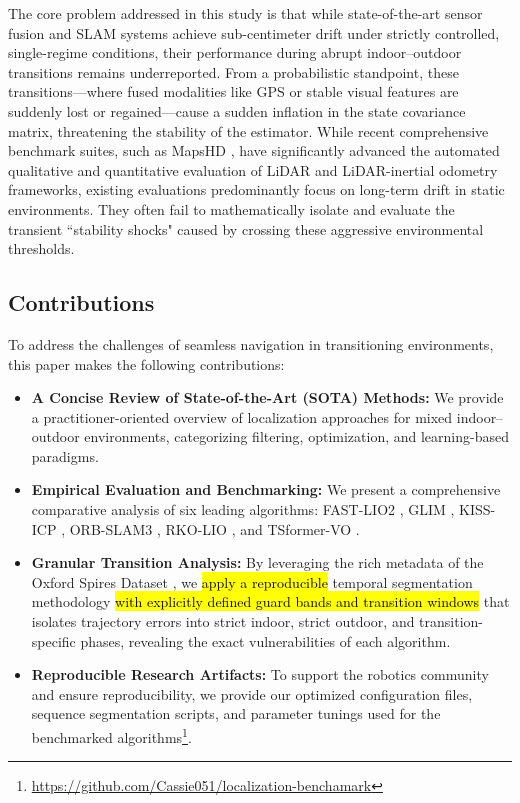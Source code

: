 \documentclass[pdflatex,sn-mathphys-num]{sn-jnl}
\theoremstyle{thmstyleone}%
\theoremstyle{thmstyletwo}%
\theoremstyle{thmstylethree}%
\begin{document}
The core problem addressed in this study is that while state-of-the-art sensor fusion and SLAM systems achieve sub-centimeter drift under strictly controlled, single-regime conditions, their performance during abrupt indoor–outdoor transitions remains underreported. From a probabilistic standpoint, these transitions—where fused modalities like GPS or stable visual features are suddenly lost or regained—cause a sudden inflation in the state covariance matrix, threatening the stability of the estimator. While recent comprehensive benchmark suites, such as MapsHD \cite{bedkowski2026mapshd}, have significantly advanced the automated qualitative and quantitative evaluation of LiDAR and LiDAR-inertial odometry frameworks, existing evaluations predominantly focus on long-term drift in static environments. They often fail to mathematically isolate and evaluate the transient ``stability shocks" caused by crossing these aggressive environmental thresholds.

\subsection{Contributions}
To address the challenges of seamless navigation in transitioning environments, this paper makes the following contributions:
\begin{itemize}
    \item \textbf{A Concise Review of State-of-the-Art (SOTA) Methods:} We provide a practitioner-oriented overview of localization approaches for mixed indoor–outdoor environments, categorizing filtering, optimization, and learning-based paradigms.
    \item \textbf{Empirical Evaluation and Benchmarking:} We present a comprehensive comparative analysis of six leading algorithms: FAST-LIO2 \cite{FAST-LIO2}, GLIM \cite{Koide_2024}, KISS-ICP \cite{KISS-ICP}, ORB-SLAM3 \cite{ORB-SLAM3}, RKO-LIO \cite{RKO-LIO}, and TSformer-VO \cite{franccani2025transformer}.
    \item \textbf{Granular Transition Analysis:} By leveraging the rich metadata of the Oxford Spires Dataset \cite{tao2025spires}, we \hl{apply a reproducible} temporal segmentation methodology \hl{with explicitly defined guard bands and transition windows} that isolates trajectory errors into strict indoor, strict outdoor, and transition-specific phases, revealing the exact vulnerabilities of each algorithm.
    \item \textbf{Reproducible Research Artifacts:} To support the robotics community and ensure reproducibility, we provide our optimized configuration files, sequence segmentation scripts, and parameter tunings used for the benchmarked algorithms\footnote{ \url{https://github.com/Cassie051/localization-benchamark}}.
\end{itemize}
\end{document}
